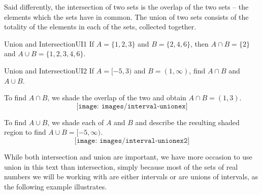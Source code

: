 Said differently, the intersection of two sets is the overlap of the two sets -- the elements which the sets have in common.  The union of two sets consists of the totality of the elements in each of the sets, collected together.	
	
\begin{example}{Union and Intersection}{UI1}	
If $A = \{ 1,2,3 \}$ and $B = \{2,4,6 \}$, then $A \cap B = \{2\}$ and $A \cup B = \{1,2,3,4,6\}$. 
\end{example}

\begin{example}{Union and Intersection}{UI2}
  If $A = [-5,3)$ and $B = (1, \infty)$, find $A \cap B$ and $A\cup B$.  
\end{example}
\begin{solution}
	To find $A\cap B$, we shade  the overlap of the two and obtain $A \cap B = (1,3)$. \\
	$$\texttt{[image: images/interval-unionex]}$$
	
	 To find $A \cup B$, we shade each of $A$ and $B$ and describe the resulting shaded region to find  $A \cup B = [-5,\infty)$.\\
	 $$\texttt{[image: images/interval-unionex2]}$$
	 
\end{solution}	



While both intersection and union are important, we have more occasion to use union in this text than intersection, simply because most of the sets of real numbers we will be working with are either intervals or are unions of intervals, as the following example illustrates.

